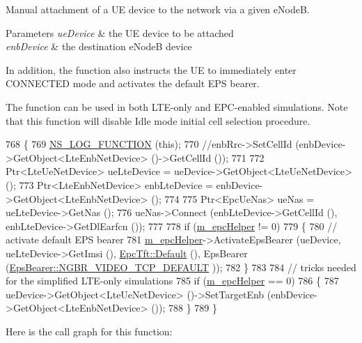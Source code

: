 Manual attachment of a UE device to the network via a given e\+NodeB. 


\begin{DoxyParams}{Parameters}
{\em ue\+Device} & the UE device to be attached \\
\hline
{\em enb\+Device} & the destination e\+NodeB device\\
\hline
\end{DoxyParams}
In addition, the function also instructs the UE to immediately enter C\+O\+N\+N\+E\+C\+T\+ED mode and activates the default E\+PS bearer.

The function can be used in both L\+T\+E-\/only and E\+P\+C-\/enabled simulations. Note that this function will disable Idle mode initial cell selection procedure. 
\begin{DoxyCode}
768 \{
769   \hyperlink{log-macros-disabled_8h_a90b90d5bad1f39cb1b64923ea94c0761}{NS\_LOG\_FUNCTION} (\textcolor{keyword}{this});
770   \textcolor{comment}{//enbRrc->SetCellId (enbDevice->GetObject<LteEnbNetDevice> ()->GetCellId ());}
771 
772   Ptr<LteUeNetDevice> ueLteDevice = ueDevice->GetObject<LteUeNetDevice> ();
773   Ptr<LteEnbNetDevice> enbLteDevice = enbDevice->GetObject<LteEnbNetDevice> ();
774 
775   Ptr<EpcUeNas> ueNas = ueLteDevice->GetNas ();
776   ueNas->Connect (enbLteDevice->GetCellId (), enbLteDevice->GetDlEarfcn ());
777 
778   \textcolor{keywordflow}{if} (\hyperlink{classns3_1_1LteHelper_aeec42671d76d5bd719b37d77bfd27633}{m\_epcHelper} != 0)
779     \{
780       \textcolor{comment}{// activate default EPS bearer}
781       \hyperlink{classns3_1_1LteHelper_aeec42671d76d5bd719b37d77bfd27633}{m\_epcHelper}->ActivateEpsBearer (ueDevice, ueLteDevice->GetImsi (), 
      \hyperlink{classns3_1_1EpcTft_a48c099da249ba99152c2e597c864e155}{EpcTft::Default} (), EpsBearer (\hyperlink{structns3_1_1EpsBearer_aecf0c67109c5eb4ec0b07226fff5885ea0e7232f1a6148d754be3a3d9e425d452}{EpsBearer::NGBR\_VIDEO\_TCP\_DEFAULT}
      ));
782     \}
783 
784   \textcolor{comment}{// tricks needed for the simplified LTE-only simulations }
785   \textcolor{keywordflow}{if} (\hyperlink{classns3_1_1LteHelper_aeec42671d76d5bd719b37d77bfd27633}{m\_epcHelper} == 0)
786     \{
787       ueDevice->GetObject<LteUeNetDevice> ()->SetTargetEnb (enbDevice->GetObject<LteEnbNetDevice> ());
788     \}
789 \}
\end{DoxyCode}


Here is the call graph for this function\+:


